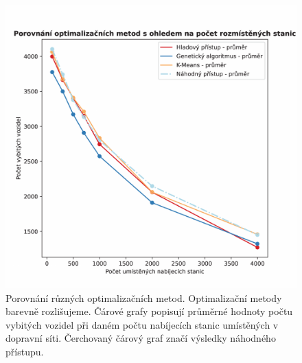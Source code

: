 \begin{figure}
    \centering
    \includegraphics[width=1\linewidth]{img/all.pdf}
    \caption{Porovnání různých optimalizačních metod. Optimalizační metody barevně
    rozlišujeme. Čárové grafy popisují průměrné hodnoty počtu vybitých vozidel při
    daném počtu nabíjecích stanic umístěných v dopravní síti. 
    Čerchovaný čárový graf značí výsledky náhodného přístupu.}
    \label{fig:porovnani_optimalizaci_all}
\end{figure}


